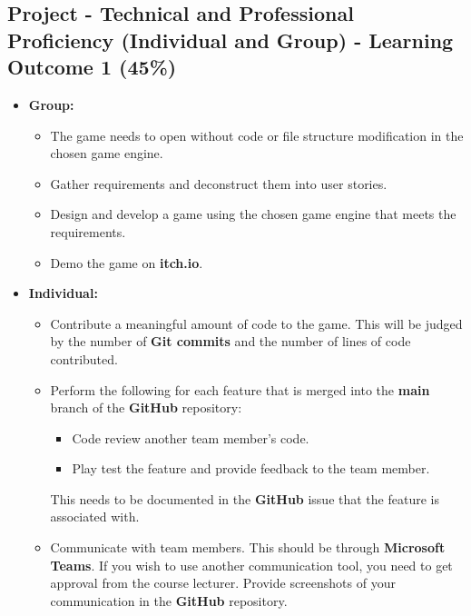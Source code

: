 \documentclass{article}
\begin{document}
\subsection*{Project - Technical and Professional Proficiency (Individual and Group) - Learning Outcome 1 (45\%)}
\begin{itemize}
	 \item \textbf{Group:}
	\begin{itemize}
		\item The game needs to open without code or file structure modification in the chosen game engine.
		\item Gather requirements and deconstruct them into user stories.
		\item Design and develop a game using the chosen game engine that meets the requirements. 
		\item Demo the game on \textbf{itch.io}.
	\end{itemize}
	\item \textbf{Individual:}
	\begin{itemize}
		\item Contribute a meaningful amount of code to the game. This will be judged by the number of \textbf{Git commits} and the number of lines of code contributed.
		\item Perform the following for each feature that is merged into the \textbf{main} branch of the \textbf{GitHub} repository:
		\begin{itemize}
			\item Code review another team member's code.
			\item Play test the feature and provide feedback to the team member.
		\end{itemize}
		This needs to be documented in the \textbf{GitHub} issue that the feature is associated with.
		\item Communicate with team members. This should be through \textbf{Microsoft Teams}. If you wish to use another communication tool, you need to get approval from the course lecturer. Provide screenshots of your communication in the \textbf{GitHub} repository.
	\end{itemize}
\end{itemize}
\end{document}
